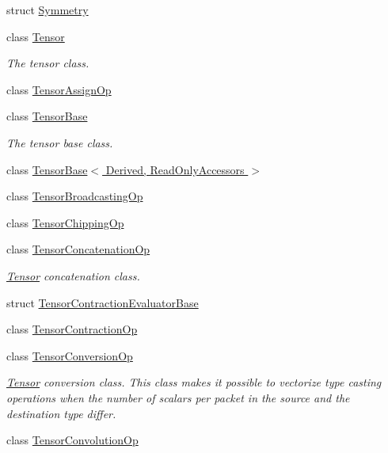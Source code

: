 \begin{DoxyCompactItemize}
\item 
struct \hyperlink{struct_eigen_1_1_symmetry}{Symmetry}
\item 
class \hyperlink{class_eigen_1_1_tensor}{Tensor}
\begin{DoxyCompactList}\small\item\em The tensor class. \end{DoxyCompactList}\item 
class \hyperlink{class_eigen_1_1_tensor_assign_op}{Tensor\+Assign\+Op}
\item 
class \hyperlink{class_eigen_1_1_tensor_base}{Tensor\+Base}
\begin{DoxyCompactList}\small\item\em The tensor base class. \end{DoxyCompactList}\item 
class \hyperlink{class_eigen_1_1_tensor_base_3_01_derived_00_01_read_only_accessors_01_4}{Tensor\+Base$<$ Derived, Read\+Only\+Accessors $>$}
\item 
class \hyperlink{class_eigen_1_1_tensor_broadcasting_op}{Tensor\+Broadcasting\+Op}
\item 
class \hyperlink{class_eigen_1_1_tensor_chipping_op}{Tensor\+Chipping\+Op}
\item 
class \hyperlink{class_eigen_1_1_tensor_concatenation_op}{Tensor\+Concatenation\+Op}
\begin{DoxyCompactList}\small\item\em \hyperlink{class_eigen_1_1_tensor}{Tensor} concatenation class. \end{DoxyCompactList}\item 
struct \hyperlink{struct_eigen_1_1_tensor_contraction_evaluator_base}{Tensor\+Contraction\+Evaluator\+Base}
\item 
class \hyperlink{class_eigen_1_1_tensor_contraction_op}{Tensor\+Contraction\+Op}
\item 
class \hyperlink{class_eigen_1_1_tensor_conversion_op}{Tensor\+Conversion\+Op}
\begin{DoxyCompactList}\small\item\em \hyperlink{class_eigen_1_1_tensor}{Tensor} conversion class. This class makes it possible to vectorize type casting operations when the number of scalars per packet in the source and the destination type differ. \end{DoxyCompactList}\item 
class \hyperlink{class_eigen_1_1_tensor_convolution_op}{Tensor\+Convolution\+Op}
\item 

\end{DoxyCompactItemize}
